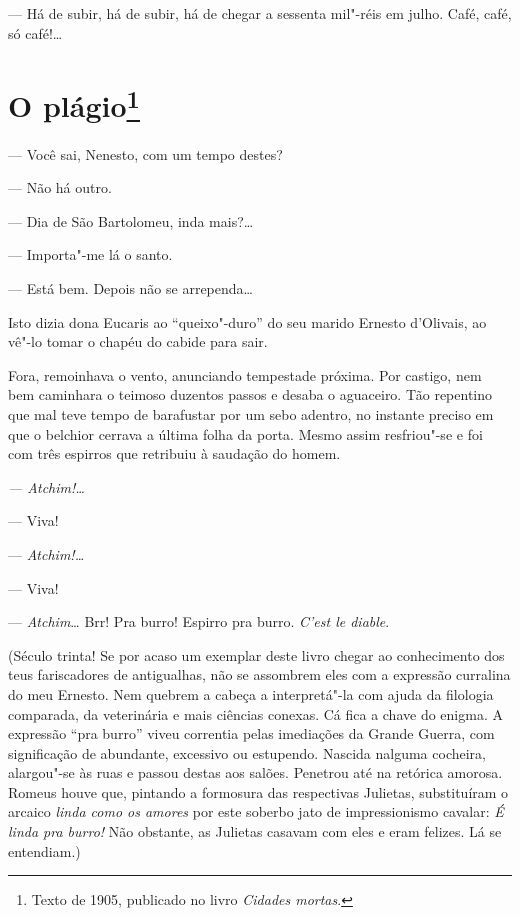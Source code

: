 --- Há de subir, há de subir, há de chegar a sessenta mil"-réis em julho.
Café, café, só café!\ldots{}

\chapter{O plágio\footnote[*]{Texto de 1905, publicado no livro \emph{Cidades mortas}.}}

--- Você sai, Nenesto, com um tempo destes?

--- Não há outro.

--- Dia de São Bartolomeu, inda mais?\ldots{}

--- Importa"-me lá o santo.

--- Está bem. Depois não se arrependa\ldots{}

Isto dizia dona Eucaris ao ``queixo"-duro'' do seu marido Ernesto
d'Olivais, ao vê"-lo tomar o chapéu do cabide para sair.

Fora, remoinhava o vento, anunciando tempestade próxima. Por castigo,
nem bem caminhara o teimoso duzentos passos e desaba o aguaceiro. Tão
repentino que mal teve tempo de barafustar por um sebo adentro, no
instante preciso em que o belchior cerrava a última folha da porta.
Mesmo assim resfriou"-se e foi com três espirros que retribuiu à saudação
do homem.

\emph{--- Atchim!\ldots{}}

--- Viva!

--- \emph{Atchim!\ldots{}}

--- Viva!

--- \emph{Atchim}\ldots{} Brr! Pra burro! Espirro pra burro. \emph{C'est
le diable}.

(Século trinta! Se por acaso um exemplar deste livro chegar ao
conhecimento dos teus fariscadores de antigualhas, não se assombrem eles
com a expressão curralina do meu Ernesto. Nem quebrem a cabeça a
interpretá"-la com ajuda da filologia comparada, da veterinária e mais
ciências conexas. Cá fica a chave do enigma. A expressão ``pra burro''
viveu correntia pelas imediações da Grande Guerra, com significação de
abundante, excessivo ou estupendo. Nascida nalguma cocheira, alargou"-se
às ruas e passou destas aos salões. Penetrou até na retórica amorosa.
Romeus houve que, pintando a formosura das respectivas Julietas,
substituíram o arcaico \emph{linda como os amores} por este soberbo jato
de impressionismo cavalar: \emph{É linda pra burro!} Não obstante, as
Julietas casavam com eles e eram felizes. Lá se entendiam.)

